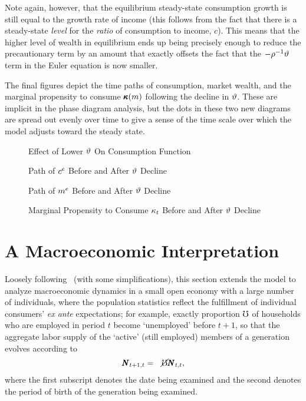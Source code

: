 \documentclass{handout}
\begin{document}
Note again, however, that the equilibrium steady-state 
consumption growth is still equal to the growth rate of income (this follows
from the fact that there is a steady-state {\it level} for the {\it
  ratio} of consumption to income, $c$).  This means that the higher
level of wealth in equilibrium ends up being precisely enough to
reduce the precautionary term by an amount that exactly offsets the
fact that the $-\rho^{-1}\vartheta$ term in the Euler equation is now
smaller.

The final figures depict the time paths of consumption, market wealth,
and the marginal propensity to consume $\pmb{\kappa}(m)$ following the
decline in $\vartheta$.  These are implicit in the phase diagram
analysis, but the dots in these two new diagrams are spread out evenly
over time to give a sense of the time scale over which the model
adjusts toward the steady state.

\begin{figure}
\caption{Effect of Lower $\vartheta$ On Consumption Function}
\label{fig:DecreaseTheta}
\end{figure}

\begin{figure}
\caption{Path of $c^{e}$ Before and After $\vartheta$ Decline}
\label{fig:cPathAfterThetaDrop}
\end{figure}

\begin{figure}
\caption{Path of $m^{e}$ Before and After $\vartheta$ Decline}
\label{fig:mPathAfterThetaDrop}
\end{figure}


\begin{figure}
\caption{Marginal Propensity to Consume $\kappa_{t}$ Before and After $\vartheta$ Decline}
\medskip
{}
\label{fig:MPCPathAfterThetaDrop}
\end{figure}

\section{A Macroeconomic Interpretation}

Loosely following~\cite{cjSOE} (with some simplifications), this section extends the model to analyze macroeconomic dynamics in a
small open economy with a large number of individuals, where the
population statistics reflect the fulfillment of individual consumers'
{\it ex ante} expectations; for example, exactly proportion $\mho$
of households who are employed in period $t$ become `unemployed' before
$t+1$, so that the aggregate labor supply of the `active' (still employed) members of a generation
evolves according to
\begin{eqnarray}
  \pmb{N}_{t+1,t} & = & \cancel{\mho} \pmb{N}_{t,t}
,
\end{eqnarray}
where the first subscript denotes the date being examined and the second denotes
the period of birth of the generation being examined.
\end{document}
